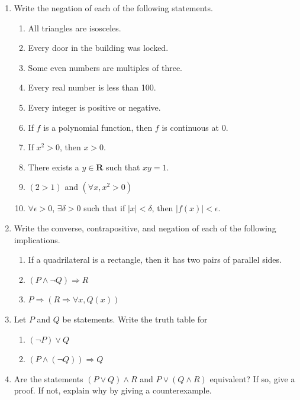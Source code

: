 \begin{enumerate}

\item Write the negation of each of the following statements.

 \begin{enumerate}
\item All triangles are isosceles.
\item Every door in the building was locked.
\item Some even numbers are multiples of three.
\item Every real number is less than 100.
\item Every integer is positive or negative.
\item If $f$ is a polynomial function, then $f$ is continuous at $0$.
\item If $x^2 > 0$, then $x > 0$.
\item There exists a $y \in \mathbf{R}$ such that $xy = 1$.
\item $(2 > 1)$ and $(\forall x, x^2 > 0)$
\item $\forall \epsilon > 0$, $\exists \delta > 0$ such that if $|x| < \delta$, then $|f(x)| < \epsilon$.
\end{enumerate}

\item Write the converse, contrapositive, and negation of each of the following implications.

 \begin{enumerate}
\item If a quadrilateral is a rectangle, then it has two pairs of parallel sides.
\item $(P \wedge \neg Q) \Rightarrow R$
\item $P  \Rightarrow (R \Rightarrow \forall x, Q(x))$
\end{enumerate}

\item Let $P$ and $Q$ be statements. Write the truth table for
  \begin{enumerate}
  \item $(\neg P) \vee Q$
  \item $(P \wedge (\neg Q)) \Rightarrow Q$
  \end{enumerate}

  
\item Are the statements $(P \vee Q) \wedge R$ and $P \vee (Q \wedge R)$ equivalent? If so, give a proof. If not, explain why by giving a counterexample.


\end{enumerate}

